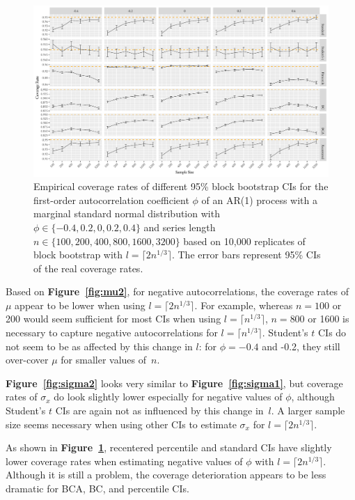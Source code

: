 \documentclass[10pt]{article}
\begin{document}
\begin{figure}[tbp]
  \centering
  \includegraphics[width=\textwidth]{figures/plot_norm_phi_2}
  \caption{Empirical coverage rates of different 95\% block bootstrap CIs for 
    the first-order autocorrelation coefficient $\phi$ of an AR(1) process with 
    a marginal standard normal distribution with 
    $\phi \in \{-0.4, 0.2, 0, 0.2, 0.4\}$ and series length
    $n \in \{100, 200, 400, 800, 1600, 3200\}$ based on 10,000 replicates of
    block bootstrap with $l = \lceil 2n^{1/3} \rceil$. The
    error bars represent 95\% CIs of the real coverage rates.}
  \label{fig:phi2}
\end{figure}

Based on \textbf{Figure~\ref{fig:mu2}}, for negative autocorrelations, the 
coverage 
rates of $\mu$ appear to be lower when
using $l = \lceil 2n^{1/3} \rceil$. For example, whereas $n = 100$ or 200 
would seem sufficient for most CIs when using $l = \lceil n^{1/3} \rceil$, 
$n = 800$ or 1600 is necessary to capture negative autocorrelations for 
$l = \lceil n^{1/3} \rceil$. Student's $t$ CIs do not seem to be as affected
by this change in $l$: for $\phi = -0.4$ and -0.2, they still over-cover $\mu$
for smaller values of~$n$. 

\textbf{Figure~\ref{fig:sigma2}} looks very similar to 
\textbf{Figure~\ref{fig:sigma1}}, but coverage rates of $\sigma_x$ do look 
slightly lower
especially for negative values of $\phi$, although Student's $t$ CIs are again
not as influenced by this change in~$l$. A larger sample size seems necessary
when using other CIs to estimate $\sigma_x$ for $l = \lceil 2n^{1/3} \rceil$.

As shown in \textbf{Figure~\ref{fig:phi2}},
recentered percentile and standard CIs have slightly lower coverage rates when
estimating negative values of $\phi$ with $l = \lceil 2n^{1/3} \rceil$. 
Although it is still a problem, the coverage deterioration appears to be less 
dramatic for BCA,
BC, and percentile CIs.
\end{document}
